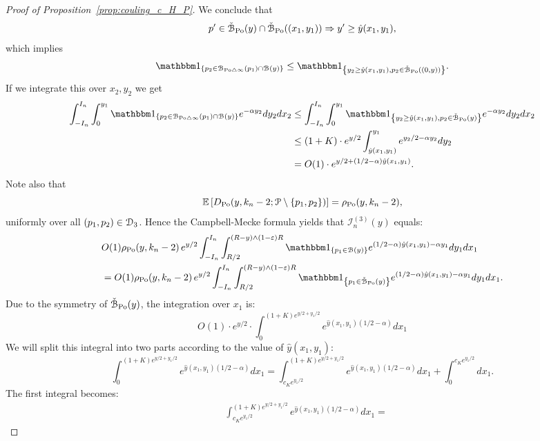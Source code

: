 \begin{proof}[Proof of Proposition~\ref{prop:couling_c_H_P}]
We conclude that 
\begin{equation*}\label{eq:intersex_approx}
	p^\prime \in \check{{\mathcal B}}_{{\mathrm{Po}}}(y)\cap \check{{\mathcal B}}_{{\mathrm{Po}}}((x_1,y_1)) \Rightarrow y^\prime \ge \hat{y}(x_1,y_1),
\end{equation*}
which implies
\begin{equation} \label{eq:symdiff_loc}
\begin{split} 
 \ind{p_2 \in \BallSym{p_1}\cap \BallHyp{y}} \leq \ind{y_2 \geq \hat{y}(x_1,y_1), p_2 \in \FatBallHyp{(0,y)}}.
\end{split}
\end{equation}
If we integrate this over $x_2, y_2$ we get 
\begin{align*}
\int_{-I_n}^{I_n} \int_{0}^{y_1}  \ind{p_2 \in \BallSym{p_1}\cap \BallHyp{y}}  
e^{-\alpha y_2} dy_2 dx_2
&  \leq 
\int_{-I_n}^{I_n} \int_{0}^{y_1}  \ind{y_2 \geq \hat{y}(x_1,y_1), p_2 \in \FatBallHyp{y}}  
e^{-\alpha y_2} dy_2 dx_2 \\
&\leq (1+K) \cdot e^{y/2} \int_{\hat{y}(x_1,y_1)}^{y_1} e^{y_2/2 - \alpha y_2} dy_2 \\
&=O(1) \cdot e^{y/2 + (1/2 -\alpha) \hat{y}(x_1,y_1)}.
\end{align*}
Note also that 
\[
	\mathbb{E}\left[D_{{\mathrm{Po}}} (y,k_n-2;{\mathcal P} \setminus \{p_1, p_2\})\right] = \rho_{{\mathrm{Po}}}(y,k_n-2),
\]
uniformly over all $(p_1, p_2) \in \mathcal{D}_{3}$. Hence the Campbell-Mecke formula yields that $\mathcal{I}_n^{(3)}(y)$ equals: 
\begin{align*}
 	&O(1) \rho_{\Po}(y,k_n-2) \, e^{y/2} \int_{-I_n}^{I_n} \int_{R/2}^{(R - y) \wedge (1-\eps)R}  
		\ind{p_1 \in \BallHyp{y}} e^{(1/2 -\alpha) \hat{y}(x_1,y_1) - \alpha y_1} dy_1dx_1 \\
	&= O(1) \rho_{\Po}(y,k_n-2) \, e^{y/2} \int_{-I_n}^{I_n} \int_{R/2}^{(R - y) \wedge (1-\eps)R}  
		\ind{p_1 \in \FatBallHyp{y}} e^{(1/2 -\alpha) \hat{y}(x_1,y_1) - \alpha y_1} dy_1dx_1.
\end{align*}
Due to the symmetry of $\check{{\mathcal B}}_{{\mathrm{Po}}}(y)$, the integration over $x_1$ is: 
\[
	O(1) \cdot e^{y/2} \cdot \int_0^{(1+K)e^{y/2 + y_1/2}} e^{\hat{y}(x_1,y_1) (1/2 -\alpha)} dx_1
\]
We will split this integral into two parts according to the value of $\hat{y}(x_1,y_1)$:
\[
\int_0^{(1+K) e^{y/2 + y_1/2}} e^{\hat{y}(x_1,y_1) (1/2 -\alpha)} dx_1 = 
\int_{c_K e^{y_1/2}}^{(1+K)e^{y/2 + y_1/2}} e^{\hat{y}(x_1,y_1) (1/2 -\alpha)} dx_1 + \int_0^{c_K e^{y_1/2}} dx_1.
\]
The first integral becomes: 
\begin{align*}
&\int_{c_K e^{y_1/2}}^{(1+K)e^{y/2 + y_1/2}} e^{\hat{y}(x_1,y_1) (1/2 -\alpha)} dx_1  = 

\end{align*}
\end{proof}
